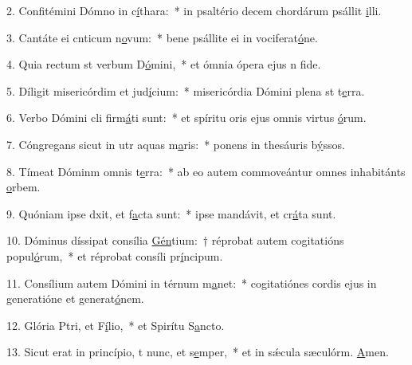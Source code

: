 2. Confitémini Dómno in c\uline{í}thara:~* in psaltério decem chordárum psállit \uline{i}lli.\par 
3. Cantáte ei cnticum n\uline{o}vum:~* bene psállite ei in vociferat\uline{ó}ne.\par 
4. Quia rectum st verbum D\uline{ó}mini,~* et ómnia ópera ejus n f\uline{i}de.\par 
5. Díligit misericórdim et jud\uline{í}cium:~* misericórdia Dómini plena st t\uline{e}rra.\par 
6. Verbo Dómini cli firm\uline{á}ti sunt:~* et spíritu oris ejus omnis virtus \uline{ó}rum.\par 
7. Cóngregans sicut in utr aquas m\uline{a}ris:~* ponens in thesáuris b\uline{ý}ssos.\par 
8. Tímeat Dóminm omnis t\uline{e}rra:~* ab eo autem commoveántur omnes inhabitánts \uline{o}rbem.\par 
9. Quóniam ipse dxit, et f\uline{a}cta sunt:~* ipse mandávit, et cr\uline{á}ta sunt.\par 
10. Dóminus díssipat consília \uline{Gén}tium:~† réprobat autem cogitatións popul\uline{ó}rum,~* et réprobat consíli pr\uline{í}ncipum.\par 
11. Consílium autem Dómini in térnum m\uline{a}net:~* cogitatiónes cordis ejus in generatióne et generat\uline{ó}nem.\par 
12. Glória Ptri, et F\uline{í}lio,~* et Spirítu S\uline{a}ncto.\par 
13. Sicut erat in princípio, t nunc, et s\uline{e}mper,~* et in sǽcula sæculórm. \uline{A}men.\par 
